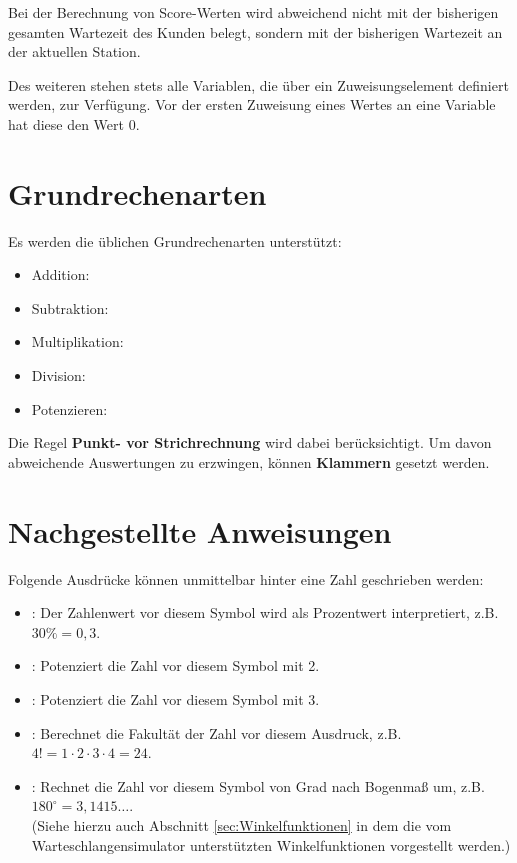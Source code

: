 Bei der Berechnung von Score-Werten wird  abweichend nicht mit der bisherigen
gesamten Wartezeit des Kunden belegt, sondern mit der bisherigen Wartezeit an der aktuellen Station.

Des weiteren stehen stets alle Variablen, die über ein Zuweisungselement definiert werden, zur Verfügung.
Vor der ersten Zuweisung eines Wertes an eine Variable hat diese den Wert 0.



\chapter{Grundrechenarten}

Es werden die üblichen Grundrechenarten unterstützt:
\begin{itemize}
\item Addition: \cmd{$+$}
\item Subtraktion: \cmd{$-$}
\item Multiplikation: \cmd{$*$}
\item Division: \cmd{$/$}
\item Potenzieren: \cmd{$\hat~$}
\end{itemize}

Die Regel \textbf{Punkt- vor Strichrechnung} wird dabei berücksichtigt.
Um davon abweichende Auswertungen zu erzwingen, können \textbf{Klammern}
gesetzt werden.



\chapter{Nachgestellte Anweisungen}

Folgende Ausdrücke können unmittelbar hinter eine Zahl geschrieben werden:

\begin{itemize}
\item
\cmd{\%}:
Der Zahlenwert vor diesem Symbol wird als Prozentwert interpretiert,
z.B.\ $30\%=0{,}3$.

\item
{}:
Potenziert die Zahl vor diesem Symbol mit 2.

\item
{}:
Potenziert die Zahl vor diesem Symbol mit 3.

\item
\cmd{!}:
Berechnet die Fakultät der Zahl vor diesem Ausdruck, z.B.\ $4!=1\cdot2\cdot3\cdot4=24$.

\item
\cmd{$^{\circ}$}:
Rechnet die Zahl vor diesem Symbol von Grad nach Bogenmaß um, z.B.\ $180^{\circ}=3{,}1415\ldots$.\\
(Siehe hierzu auch Abschnitt \ref{sec:Winkelfunktionen} in dem die vom
Warteschlangensimulator unterstützten Winkelfunktionen vorgestellt werden.)
\end{itemize}



